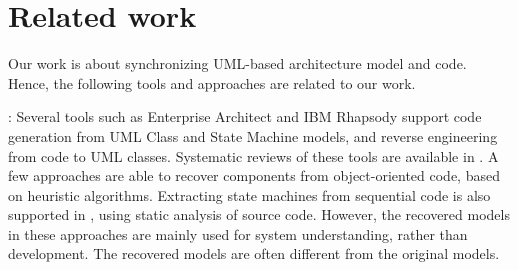 \section{Related work}
\label{sec:relatedwork}
Our work is about synchronizing UML-based architecture model and code.
Hence, the following tools and approaches are related to our work.


\noindent
{}:
Several tools such as Enterprise Architect \cite{EA} and IBM Rhapsody \cite{ibm_rhapsody} support code generation from UML Class and State Machine models, and reverse engineering from code to UML classes. 
Systematic reviews of these tools are available in \cite{Cutting2015}.
A few approaches \cite{chardigny2008extraction, favre2001g, von2014reengineering} are able to recover components from object-oriented code, based on heuristic algorithms.
Extracting state machines from sequential code is also supported in \cite{abadi2012automatic, Sen:2016:EFS:2931814.2931843}, using static analysis of source code.
However, the recovered models in these approaches are mainly used for system understanding, rather than development.
The recovered models are often different from the original models.


